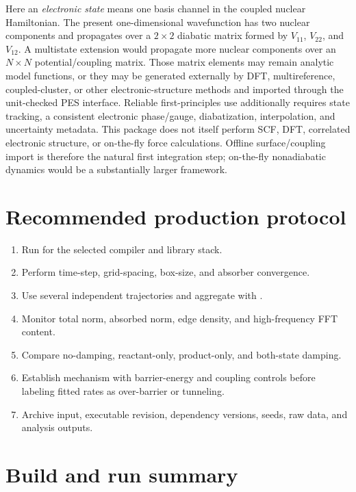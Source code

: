 \documentclass[11pt]{article}
\newcommand{\code}[1]{\texttt{\detokenize{#1}}}
\begin{document}
Here an \emph{electronic state} means one basis channel in the coupled nuclear
Hamiltonian. The present one-dimensional wavefunction has two nuclear components
and propagates over a $2\times2$ diabatic matrix formed by $V_{11}$, $V_{22}$, and
$V_{12}$. A multistate extension would propagate more nuclear components over an
$N\times N$ potential/coupling matrix. Those matrix elements may remain analytic
model functions, or they may be generated externally by DFT, multireference,
coupled-cluster, or other electronic-structure methods and imported through the
unit-checked PES interface. Reliable first-principles use additionally requires
state tracking, a consistent electronic phase/gauge, diabatization, interpolation,
and uncertainty metadata. This package does not itself perform SCF, DFT, correlated
electronic structure, or on-the-fly force calculations. Offline surface/coupling
import is therefore the natural first integration step; on-the-fly nonadiabatic
dynamics would be a substantially larger framework.

\section{Recommended production protocol}

\begin{enumerate}
  \item Run \code{make test} for the selected compiler and library stack.
  \item Perform time-step, grid-spacing, box-size, and absorber convergence.
  \item Use several independent trajectories and aggregate with
        \code{analyze_ensemble.py}.
  \item Monitor total norm, absorbed norm, edge density, and high-frequency FFT content.
  \item Compare no-damping, reactant-only, product-only, and both-state damping.
  \item Establish mechanism with barrier-energy and coupling controls before
        labeling fitted rates as over-barrier or tunneling.
  \item Archive input, executable revision, dependency versions, seeds, raw data,
        and analysis outputs.
\end{enumerate}

\section{Build and run summary}
\end{document}

